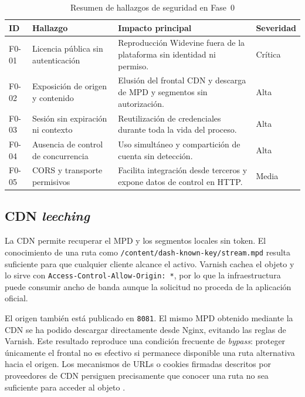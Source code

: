 \begin{table}[H]
\centering
\caption{Resumen de hallazgos de seguridad en Fase~0}
\label{tab:hallazgos-fase0}
\begin{tabularx}{\textwidth}{p{}p{}Yp{0.13\textwidth}}
\toprule
\textbf{ID} & \textbf{Hallazgo} & \textbf{Impacto principal} & \textbf{Severidad} \\
\midrule
F0-01 & Licencia pública sin autenticación & Reproducción Widevine fuera de la plataforma sin identidad ni permiso. & Crítica \\
F0-02 & Exposición de origen y contenido & Elusión del frontal CDN y descarga de MPD y segmentos sin autorización. & Alta \\
F0-03 & Sesión sin expiración ni contexto & Reutilización de credenciales durante toda la vida del proceso. & Alta \\
F0-04 & Ausencia de control de concurrencia & Uso simultáneo y compartición de cuenta sin detección. & Alta \\
F0-05 & CORS y transporte permisivos & Facilita integración desde terceros y expone datos de control en HTTP. & Media \\
\bottomrule
\end{tabularx}
\end{table}

\subsection{CDN \textit{leeching}}

La CDN permite recuperar el MPD y los segmentos locales sin token. El conocimiento de una ruta como \nolinkurl{/content/dash-known-key/stream.mpd} resulta suficiente para que cualquier cliente alcance el activo. Varnish cachea el objeto y lo sirve con \nolinkurl{Access-Control-Allow-Origin: *}, por lo que la infraestructura puede consumir ancho de banda aunque la solicitud no proceda de la aplicación oficial.

El origen también está publicado en \nolinkurl{8081}. El mismo MPD obtenido mediante la CDN se ha podido descargar directamente desde Nginx, evitando las reglas de Varnish. Este resultado reproduce una condición frecuente de \textit{bypass}: proteger únicamente el frontal no es efectivo si permanece disponible una ruta alternativa hacia el origen. Los mecanismos de URLs o cookies firmadas descritos por proveedores de CDN persiguen precisamente que conocer una ruta no sea suficiente para acceder al objeto \cite{googlemediacdn2026,awscloudfront2026}.


